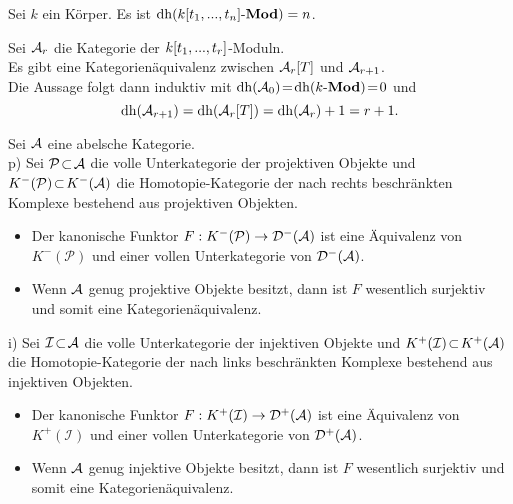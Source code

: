 \documentclass{cheat-sheet}
\DeclareMathOperator{\dimh}{dh} %
\newcommand{\Inj}{\mathcal{I}} %
\newcommand{\Proj}{\mathcal{P}} %
\begin{document}
\begin{thm}[Hilbert]
  Sei $k$ ein Körper. Es ist $\dimh(\LMod{k[t_1, \nldots, t_n]}) = n$.
\end{thm}

\begin{beweisidee}
  Sei $\mathcal{A}_r$ die Kategorie der $k[t_1, ..., t_r]$-Moduln. \\
  Es gibt eine Kategorienäquivalenz zwischen $\mathcal{A}_r[T]$ und $\mathcal{A}_{r+1}$. \\
  Die Aussage folgt dann induktiv mit $\dimh(\Aat_0) \!=\! \dimh(\LMod{k}) \!=\! 0$ und
  \[ \dimh(\Aat_{r+1}) = \dimh(\Aat_r[T]) = \dimh(\Aat_r) + 1 = r + 1. \]
\end{beweisidee}



\begin{thm}
  Sei $\mathcal{A}$ eine abelsche Kategorie. \\
  p) \enspace Sei $\Proj \!\subset\! \Aat$ die volle Unterkategorie der projektiven Objekte und $K^-(\Proj) \!\subset\! K^-(\Aat)$ die Homotopie-Kategorie der nach rechts beschränkten Komplexe bestehend aus projektiven Objekten.
  \begin{itemize}
    \item Der kanonische Funktor $F : K^-(\Proj) \to \Der^-(\Aat)$ ist eine Äquivalenz von $K^-(\Proj)$ und einer vollen Unterkategorie von $\mathcal{D}^-(\mathcal{A})$.
    \item Wenn $\mathcal{A}$ genug projektive Objekte besitzt, dann ist $F$ wesentlich surjektiv und somit eine Kategorienäquivalenz.
  \end{itemize}
  i) \enspace Sei $\Inj \!\subset\! \Aat$ die volle Unterkategorie der injektiven Objekte und $K^+(\Inj) \!\subset\! K^+(\Aat)$ die Homotopie-Kategorie der nach links beschränkten Komplexe bestehend aus injektiven Objekten.
  \begin{itemize}
    \item Der kanonische Funktor $F : K^+(\Inj) \to \Der^+(\Aat)$ ist eine Äquivalenz von $K^+(\Inj)$ und einer vollen Unterkategorie von $\mathcal{D}^+(\mathcal{A})$.
    \item Wenn $\mathcal{A}$ genug injektive Objekte besitzt, dann ist $F$ wesentlich surjektiv und somit eine Kategorienäquivalenz.
  \end{itemize}
\end{thm}
\end{document}
